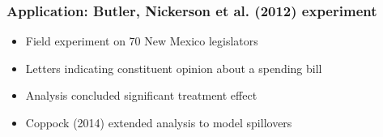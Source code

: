\documentclass{beamer}
\begin{document}
\begin{frame}
\frametitle{Application: Butler, Nickerson et al. (2012) experiment}
\begin{itemize}
\item {\LARGE Field experiment on 70 New Mexico legislators}
\vspace{5mm}
\item {\LARGE Letters indicating constituent opinion about a spending bill}
\vspace{5mm}
\item {\LARGE Analysis concluded significant treatment effect}
\vspace{5mm}
\item {\LARGE Coppock (2014) extended analysis to model spillovers}
\end{itemize}
\end{frame}
\end{document}
